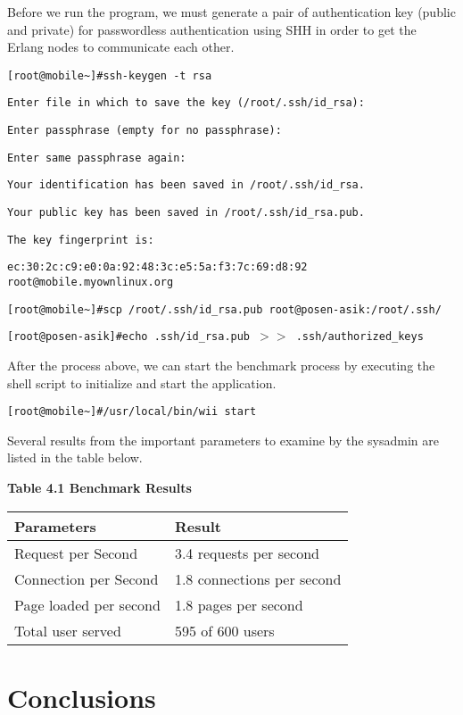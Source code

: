 \documentclass[final,
notitlepage,
narroweqnarray,
    inline,
    twoside,
]{ieee}
\begin{document}
Before we run the program, we must generate a pair of
authentication key (public and private) for passwordless
authentication using SHH in order to get the Erlang nodes to
communicate each other.

\texttt{[root@mobile\~{}]\#ssh-keygen -t rsa}

\texttt{Enter file in which to save the key (/root/.ssh/id\_rsa):}

\texttt{Enter passphrase (empty for no passphrase):}

\texttt{Enter same passphrase again:}

\texttt{Your identification has been saved in /root/.ssh/id\_rsa.}

\texttt{Your public key has been saved in /root/.ssh/id\_rsa.pub.}

\texttt{The key fingerprint is:}

\texttt{ec:30:2c:c9:e0:0a:92:48:3c:e5:5a:f3:7c:69:d8:92
root@mobile.myownlinux.org}

\texttt{[root@mobile\~{}]\#scp /root/.ssh/id\_rsa.pub
root@posen-asik:/root/.ssh/}

\texttt{[root@posen-asik]\#echo .ssh/id\_rsa.pub $>$$>$
.ssh/authorized\_keys}


After the process above, we can start the benchmark process by
executing the shell script to initialize and start the
application.

\texttt{[root@mobile\~{}]\#/usr/local/bin/wii start}

Several results from the important parameters to examine by the sysadmin are listed in the table below.

\textbf{Table 4.1 Benchmark Results}

\begin{tabular}{|p{0.9in}|p{1.0in}|} \hline
\textbf{Parameters} & \textbf{Result} \\ \hline
Request per Second & 3.4 requests per second \\ \hline
Connection per Second & 1.8 connections per second \\ \hline
Page loaded per second & 1.8 pages per second \\ \hline
Total user served & 595 of 600 users \\ \hline
\end{tabular}

\textbf{}

\section{Conclusions}
\end{document}
